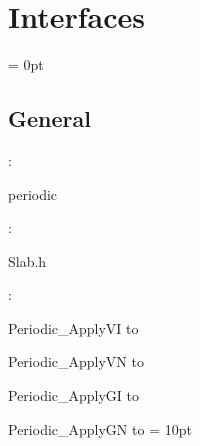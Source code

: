 
\section{Interfaces} 


\parskip = 0pt

\vspace{3mm} \subsection*{General}

: 

periodic
\vspace{2mm}

\vspace{5mm}

: 

Slab.h
\vspace{2mm}

: 



Periodic\_ApplyVI to 

Periodic\_ApplyVN to 

Periodic\_ApplyGI to 

Periodic\_ApplyGN to 
\vspace{2mm}\parskip = 10pt 
